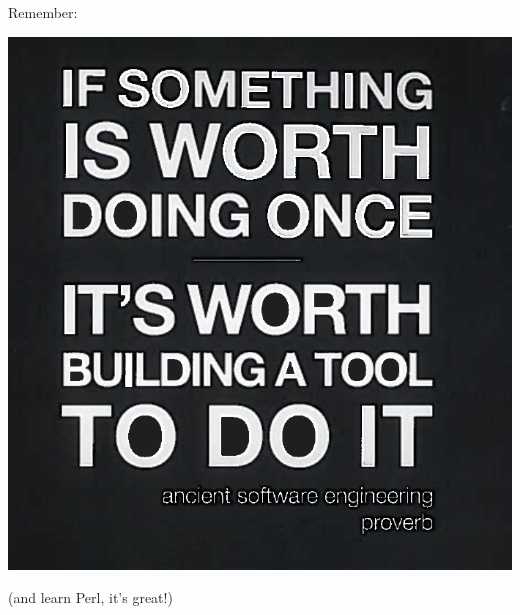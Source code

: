 \documentclass[handout,]{beamer}
\begin{document}
\begin{frame}
Remember:

\begin{center}
  \includegraphics[height=0.8\textheight]{Build.png}
\end{center}

(and learn Perl, it's great!)

\end{frame}
\end{document}
